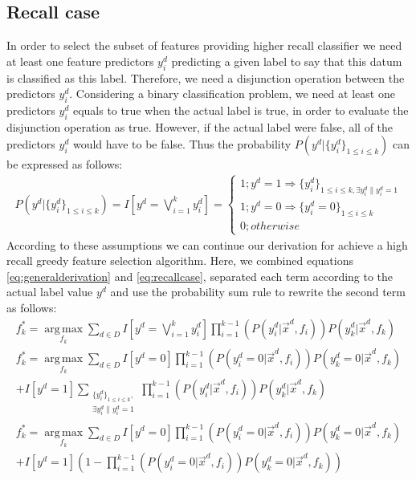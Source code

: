 \documentclass{article}
\begin{document}
\subsection{Recall case}
In order to select the subset of features providing higher recall classifier we need at least one feature predictors $y^d_i$ predicting a given label to say that this datum is classified as this label. Therefore, we need a disjunction operation between the predictors $y^d_i$. Considering a binary classification problem, we need at least one predictors $y^d_i$ equals to true when the actual label is true, in order to evaluate the disjunction operation as true. However, if the actual label were false, all of the predictors $y^d_i$ would have to be false. Thus the probability  $P(y^d| \{y^d_i\}_{1 \leq i \leq k})$ can be expressed as follows:
\begin{gather}
P(y^d| \{y^d_i\}_{1 \leq i \leq k}) = I\left[y^d = \bigvee_{i=1}^k y^d_i\right] = 
\begin{cases}
     1 ; y^d = 1 \Rightarrow \{y_i^d\}_{1 \leq i \leq k, \exists{ y_i^d\| y_i^d = 1 }}\\
     1; y^d = 0 \Rightarrow \{y_i^d = 0\}_{1 \leq i \leq k}\\
     0; otherwise
\end{cases}\label{eq:recallcase}
\end{gather}
According to these assumptions we can continue our derivation for achieve a high recall greedy feature selection algorithm. Here, we combined equations \eqref{eq:generalderivation} and \eqref{eq:recallcase}, separated each term according to the actual label value $y^d$ and use the probability sum rule to rewrite the second term as follows:
\begin{gather}
f_{k}^* = \operatorname*{arg\,max}_{f_k} \sum_{d \in D} I\left[y^d = \bigvee_{i=1}^k y^d_i\right] \prod_{i=1}^{k-1}\left(P(y_i^d |\vec{x}^d, f_i)\right)P(y_k^d |\vec{x}^d, f_k)\\
f_{k}^* = \operatorname*{arg\,max}_{f_k} \sum_{d \in D} I[y^d = 0] \prod_{i=1}^{k-1}\left(P(y_i^d = 0 |\vec{x}^d, f_i)\right)P(y_k^d = 0 |\vec{x}^d, f_k) \\+ I[y^d = 1] \sum_{\substack{\{y_i^d\}_{1 \leq i \leq k},\\ \exists{ y_i^d\| y_i^d = 1} }} \prod_{i=1}^{k-1}\left(P(y_i^d |\vec{x}^d, f_i)\right)P(y_k^d |\vec{x}^d, f_k)\\
f_{k}^* = \operatorname*{arg\,max}_{f_k} \sum_{d \in D} I[y^d = 0] \prod_{i=1}^{k-1}\left(P(y_i^d = 0 |\vec{x}^d, f_i)\right)P(y_k^d = 0 |\vec{x}^d, f_k) \\+ I[y^d = 1]\left(1 - \prod_{i=1}^{k-1}\left(P(y_i^d = 0 |\vec{x}^d, f_i)\right)P(y_k^d = 0 |\vec{x}^d, f_k)\right)\label{eq:equationForRecallCase}
\end{gather}
\end{document}
